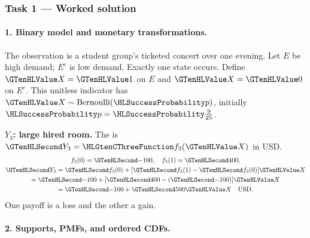 \subsubsection*{Task 1 --- Worked solution}\label{sol:c3-restaurant-model}
\paragraph{1. Binary model and monetary transformations.}
The observation is a student group's ticketed concert over one evening. Let $E$ be high demand; $E^c$ is low demand. Exactly one state occurs. Define $\Indicator{X}=\Indicator{1}$ on $E$ and $\Indicator{X}=\Indicator{0}$ on $E^c$. This unitless indicator has $\Indicator{X}\sim\operatorname{Bernoulli}(\SuccessProb{p})$, initially $\SuccessProb{p}=\SuccessProb{\frac{9}{25}}$.
\noindent\begin{minipage}[t]{.48\linewidth}
\textbf{$Y_3$: large hired room.}
The  is $\Money{Y_3}=\TransformationFunction{f_3}(\Indicator{X})$ in USD.
\[
\begin{gathered}
f_3(0)=\Money{-100},\quad f_3(1)=\Money{400},\\
\Money{Y_3}=\Money{f_3(0)}+[\Money{f_3(1)}-\Money{f_3(0)}]\Indicator{X}\\
=\Money{-100}+[\Money{400}-(\Money{-100})]\Indicator{X}\\
=\Money{-100}+\Money{500}\Indicator{X}\quad\text{USD}.
\end{gathered}
\]
One payoff is a loss and the other a gain.
\end{minipage}\par
{}\paragraph{2. Supports, PMFs, and ordered CDFs.}

